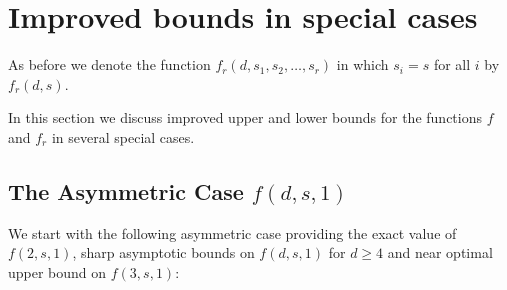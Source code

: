 \documentclass[11pt]{article}
\theoremstyle{plain}
\theoremstyle{definition}
\theoremstyle{remark}
\begin{document}
\section{Improved bounds in special cases}

\label{sec:special-cases}
As before we denote the function 
$f_r(d,s_1,s_2, \ldots ,s_r)$ in which $s_i=s$ for all $i$ by $f_r(d,s)$.

In this section we discuss improved upper and lower bounds for the 
functions $f$ and $f_r$ in several special cases.

\subsection{The Asymmetric Case $f(d,s,1)$}
We start with the following asymmetric case providing the exact value of $f(2,s,1)$, sharp asymptotic bounds on $f(d,s,1)$ for $d 
\geq 4$ and near optimal upper bound on $f(3,s,1)$:
\end{document}
